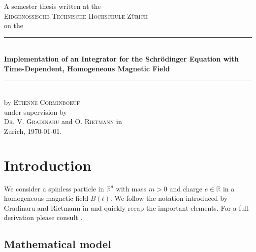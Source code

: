 \documentclass[11pt, a4paper, oneside]{article}
\begin{document}


\thispagestyle{empty}

\begin{center}
  A semester thesis written at the
  \\
  \textsc{Eidgen\"ossische Technische Hochschule Z\"urich}
  \\
  on the
  \\[0.5cm]
  \rule{\linewidth}{0.5mm}
  \\[0.4cm]
  \Large
  \textbf{Implementation of an Integrator for the Schr{\"o}dinger Equation with Time-Dependent, Homogeneous Magnetic Field}
  \normalsize
  \\[0.1cm]
  \rule{\linewidth}{0.5mm}
  \\[0.5cm]
  by \textsc{Etienne Corminboeuf}
  \\
  under supervision by
  \\
  \textsc{Dr. V. Gradinaru} and \textsc{O. Rietmann} in
  \\
  Zurich, \today.
  \\[1.0cm]
\end{center}

\newpage

\tableofcontents

\newpage

\setcounter{page}{1}

\section{Introduction} \label{sec:intro}
We consider a spinless particle in $\mathbb{R}^d$ with mass $m > 0$ and charge $e\in \mathbb{R}$ in a homogeneous magnetic field $B(t)$. We follow the notation introduced by Gradinaru and Rietmann in  and quickly recap the important elements. For a full derivation please consult .
\subsection{Mathematical model}
\end{document}
